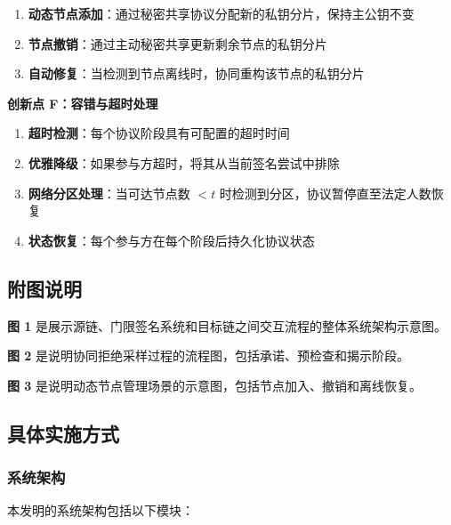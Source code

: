 \begin{enumerate}
    \item \textbf{动态节点添加}：通过秘密共享协议分配新的私钥分片，保持主公钥不变
    \item \textbf{节点撤销}：通过主动秘密共享更新剩余节点的私钥分片
    \item \textbf{自动修复}：当检测到节点离线时，协同重构该节点的私钥分片
\end{enumerate}

\textbf{创新点 F：容错与超时处理}

\begin{enumerate}
    \item \textbf{超时检测}：每个协议阶段具有可配置的超时时间
    \item \textbf{优雅降级}：如果参与方超时，将其从当前签名尝试中排除
    \item \textbf{网络分区处理}：当可达节点数 $< t$ 时检测到分区，协议暂停直至法定人数恢复
    \item \textbf{状态恢复}：每个参与方在每个阶段后持久化协议状态
\end{enumerate}

\subsection{附图说明}

\textbf{图 1} 是展示源链、门限签名系统和目标链之间交互流程的整体系统架构示意图。

\textbf{图 2} 是说明协同拒绝采样过程的流程图，包括承诺、预检查和揭示阶段。

\textbf{图 3} 是说明动态节点管理场景的示意图，包括节点加入、撤销和离线恢复。

\subsection{具体实施方式}

\subsubsection{系统架构}

本发明的系统架构包括以下模块：

